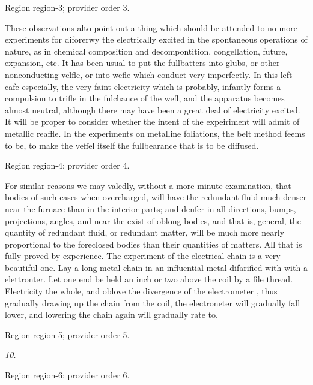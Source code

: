 \documentclass[11pt]{article}
\begin{document}
{\scriptsize\color{gray} Region region-3; provider order 3.\par}
\medskip

These observations alto point out a thing which should be attended to no more experiments for diforerwy the electrically excited in the spontaneous operations of nature, as in chemical composition and decompontition, congellation, future, expansion, etc. It has been usual to put the fullbatters into glubs, or other nonconducting velfle, or into wefle which conduct very imperfectly. In this left cafe especially, the very faint electricity which is probably, infantly forms a compulsion to trifle in the fulchance of the wefl, and the apparatus becomes almost neutral, although there may have been a great deal of electricity excited. It will be proper to consider whether the intent of the expeiriment will admit of metallic reaffle. In the experiments on metalline foliations, the belt method feems to be, to make the veffel itself the fullbearance that is to be diffused.
\par

{\scriptsize\color{gray} Region region-4; provider order 4.\par}
\medskip

For similar reasons we may valedly, without a more minute examination, that bodies of such cases when overcharged, will have the redundant fluid much denser near the furnace than in the interior parts; and denfer in all directions, bumps, projections, angles, and near the exist of oblong bodies, and that is, general, the quantity of redundant fluid, or redundant matter, will be much more nearly proportional to the foreclosed bodies than their quantities of matters. All that is fully proved by experience. The experiment of the electrical chain is a very beautiful one. Lay a long metal chain in an influential metal difarified with with a elettronter. Let one end be held an inch or two above the coil by a file thread. Electricity the whole, and oblove the divergence of the electrometer , thus gradually drawing up the chain from the coil, the electroneter will gradually fall lower, and lowering the chain again will gradually rate to.
\par

{\scriptsize\color{gray} Region region-5; provider order 5.\par}
\medskip

{\small\itshape 10.\par}

{\scriptsize\color{gray} Region region-6; provider order 6.\par}
\medskip
\end{document}
